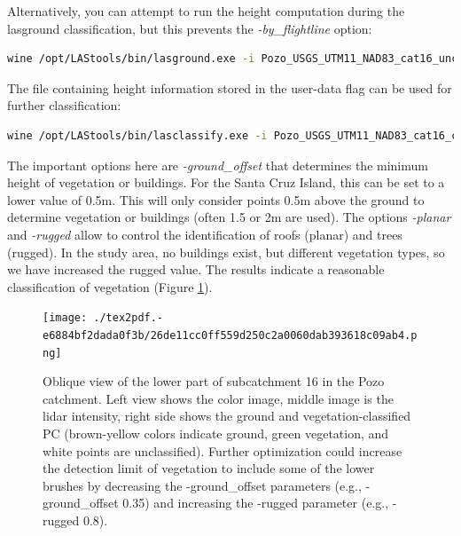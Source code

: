 \documentclass[a4paperpaper,,tablecaptionabove]{scrartcl}
\begin{document}
Alternatively, you can attempt to run the height computation during the
lasground classification, but this prevents the \emph{-by\_flightline}
option:

\begin{lstlisting}[language=bash]
wine /opt/LAStools/bin/lasground.exe -i Pozo_USGS_UTM11_NAD83_cat16_uncln.laz  -wilderness -extra_fine -offset 0.25 -stddev 20 -step 1 -spike 0.5 -bulge 0.5 -olaz -compute_height -o Pozo_USGS_UTM11_NAD83_cat16_clgh.laz 
\end{lstlisting}

The file containing height information stored in the user-data flag can
be used for further classification:

\begin{lstlisting}[language=bash]
wine /opt/LAStools/bin/lasclassify.exe -i Pozo_USGS_UTM11_NAD83_cat16_clgh.laz -ground_offset 0.5 -planar 0.1 -rugged 0.6 -olaz -o Pozo_USGS_UTM11_NAD83_cat16_clghc.laz 
\end{lstlisting}

The important options here are \emph{-ground\_offset} that determines
the minimum height of vegetation or buildings. For the Santa Cruz
Island, this can be set to a lower value of 0.5m. This will only
consider points 0.5m above the ground to determine vegetation or
buildings (often 1.5 or 2m are used). The options \emph{-planar} and
\emph{-rugged} allow to control the identification of roofs (planar) and
trees (rugged). In the study area, no buildings exist, but different
vegetation types, so we have increased the rugged value. The results
indicate a reasonable classification of vegetation (Figure
\ref{Fig:PC_cat16_lower_color_intensity_classification}).

\begin{figure}
\centering
\texttt{[image: ./tex2pdf.-e6884bf2dada0f3b/26de11cc0ff559d250c2a0060dab393618c09ab4.png]}
\caption{Oblique view of the lower part of subcatchment 16 in the Pozo
catchment. Left view shows the color image, middle image is the lidar
intensity, right side shows the ground and vegetation-classified PC
(brown-yellow colors indicate ground, green vegetation, and white points
are unclassified). Further optimization could increase the detection
limit of vegetation to include some of the lower brushes by decreasing
the -ground\_offset parameters (e.g., -ground\_offset 0.35) and
increasing the -rugged parameter (e.g., -rugged
0.8).\label{Fig:PC_cat16_lower_color_intensity_classification}}
\end{figure}
\end{document}
